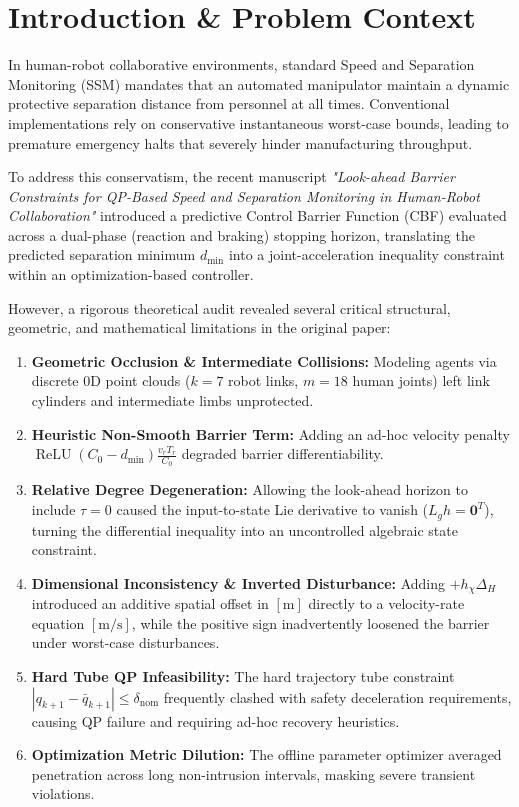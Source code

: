\documentclass[10pt,twocolumn,a4paper]{article}
\begin{document}
\section{Introduction \& Problem Context}

In human-robot collaborative environments, standard Speed and Separation Monitoring (SSM) mandates that an automated manipulator maintain a dynamic protective separation distance from personnel at all times. Conventional implementations rely on conservative instantaneous worst-case bounds, leading to premature emergency halts that severely hinder manufacturing throughput.

To address this conservatism, the recent manuscript \textit{"Look-ahead Barrier Constraints for QP-Based Speed and Separation Monitoring in Human-Robot Collaboration"} introduced a predictive Control Barrier Function (CBF) evaluated across a dual-phase (reaction and braking) stopping horizon, translating the predicted separation minimum $d_{\min}$ into a joint-acceleration inequality constraint within an optimization-based controller.

However, a rigorous theoretical audit revealed several critical structural, geometric, and mathematical limitations in the original paper:
\begin{enumerate}
    \item \textbf{Geometric Occlusion \& Intermediate Collisions:} Modeling agents via discrete 0D point clouds ($k=7$ robot links, $m=18$ human joints) left link cylinders and intermediate limbs unprotected.
    \item \textbf{Heuristic Non-Smooth Barrier Term:} Adding an ad-hoc velocity penalty $\operatorname{ReLU}(C_0 - d_{\min})\frac{v_r T_r}{C_0}$ degraded barrier differentiability.
    \item \textbf{Relative Degree Degeneration:} Allowing the look-ahead horizon to include $\tau = 0$ caused the input-to-state Lie derivative to vanish ($L_g h = \mathbf{0}^T$), turning the differential inequality into an uncontrolled algebraic state constraint.
    \item \textbf{Dimensional Inconsistency \& Inverted Disturbance:} Adding $+h_\chi \Delta_H$ introduced an additive spatial offset in $[\text{m}]$ directly to a velocity-rate equation $[\text{m/s}]$, while the positive sign inadvertently loosened the barrier under worst-case disturbances.
    \item \textbf{Hard Tube QP Infeasibility:} The hard trajectory tube constraint $|q_{k+1} - \bar{q}_{k+1}| \le \delta_{\text{nom}}$ frequently clashed with safety deceleration requirements, causing QP failure and requiring ad-hoc recovery heuristics.
    \item \textbf{Optimization Metric Dilution:} The offline parameter optimizer averaged penetration across long non-intrusion intervals, masking severe transient violations.
\end{enumerate}
\end{document}
